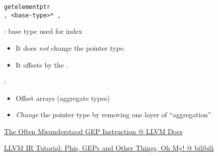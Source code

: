 \begin{frame}{}
  \begin{center}
    \texttt{getelementptr \\[5pt] , <base-type>* , \teal{[i32 <index>]+}}
  \end{center}

  \pause
  \vspace{0.80cm}
  : base type used for  index
  \begin{itemize}
    \setlength{\itemsep}{5pt}
    \item It does \emph{not} change the pointer type.
    \item It offsets by the .
  \end{itemize}

  \pause
  \vspace{0.80cm}
  :
  \begin{itemize}
    \setlength{\itemsep}{5pt}
    \item Offset  arrays (aggregate types)
    \item \emph{Change} the pointer type by removing one layer of ``aggregation''
  \end{itemize}
\end{frame}

\begin{frame}{}
  \begin{center}
    \href{https://llvm.org/docs/GetElementPtr.html}{The Often Misunderstood GEP Instruction @ LLVM Docs}
  \end{center}

  \pause
  \vspace{0.30cm}
  \begin{center}

    \vspace{0.30cm}
    \href{https://www.bilibili.com/video/BV1oE411y711/?share_source=copy_web&vd_source=afddc1f6e07c3046ed07519aa34370fd}{LLVM IR Tutorial: Phis, GEPs and Other Things, Oh My! @ bilibili}
  \end{center}
\end{frame}
